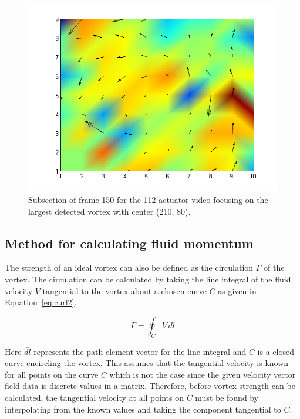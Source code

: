  

\begin{figure}[H]
     
     \center
     \includegraphics[width=0.4\textheight]{Pictures/newCurl.png}
     \caption{Subsection of frame 150 for the 112 actuator video focusing on the largest detected vortex with center (210, 80).}
     \label{fig:curl2}
\end{figure}

\subsection{Method for calculating fluid momentum}
\label{sec:momentum}
 

The strength of an ideal vortex can also be defined as the circulation $\Gamma$ of the vortex. The circulation can be calculated by taking the line integral of the fluid velocity $\bar{V}$ tangential to the vortex about a chosen curve $C$ as given in Equation~\ref{eq:curl2}. 


\begin{equation}\label{eq:curl2}
\Gamma = \oint_{C} \bar{V} \,  \bar{dl}
\end{equation}

Here $\bar{dl}$ represents the path element vector for the line integral and $C$ is a closed curve encircling the vortex. This assumes that the tangential velocity is known for all points on the curve $C$ which is not the case since the given velocity vector field data is discrete values in a matrix. Therefore, before vortex strength can be calculated, the tangential velocity at all points on $C$ must be found by interpolating from the known values and taking the component tangential to $C$.



